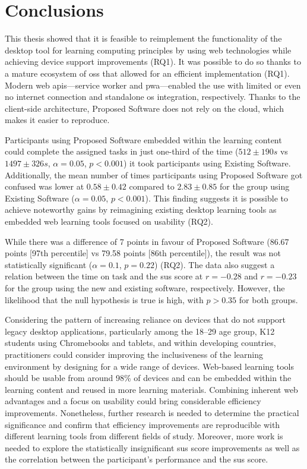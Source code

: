 \chapter{Conclusions}
\label{Conclusions}

This thesis showed that it is feasible to reimplement the functionality of the desktop tool for learning computing principles by using web technologies while achieving device support improvements (RQ1).
It was possible to do so thanks to a mature ecosystem of \gls{oss} that allowed for an efficient implementation (RQ1).
Modern web \glspl{api}---service worker and \gls{pwa}---enabled the use with limited or even no internet connection and standalone \gls{os} integration, respectively.
Thanks to the client-side architecture, Proposed Software does not rely on the cloud, which makes it easier to reproduce.

Participants using Proposed Software embedded within the learning content could complete the assigned tasks in just one-third of the time ($512 \pm190 s$ vs $1497 \pm326 s$, $\alpha=0.05$, $p<0.001$) it took participants using Existing Software.
Additionally, the mean number of times participants using Proposed Software got confused was lower at $0.58 \pm 0.42$ compared to $2.83 \pm 0.85$ for the group using Existing Software ($\alpha=0.05$, $p<0.001$).
This finding suggests it is possible to achieve noteworthy gains by reimagining existing desktop learning tools as embedded web learning tools focused on usability (RQ2).

While there was a difference of 7 points in favour of Proposed Software (86.67 points [97th percentile] vs 79.58 points [86th percentile]), the result was not statistically significant ($\alpha=0.1$, $p=0.22$) (RQ2).
The data also suggest a relation between the time on task and the \gls{sus} score at $r=-0.28$ and $r=-0.23$ for the group using the new and existing software, respectively.
However, the likelihood that the null hypothesis is true is high, with $p > 0.35$ for both groups.

Considering the pattern of increasing reliance on devices that do not support legacy desktop applications, particularly among the 18--29 age group, K12 students using Chromebooks and tablets, and within developing countries, practitioners could consider improving the inclusiveness of the learning environment by designing for a wide range of devices.
Web-based learning tools should be usable from around 98\% of devices and can be embedded within the learning content and reused in more learning materials.
Combining inherent web advantages and a focus on usability could bring considerable efficiency improvements.
Nonetheless, further research is needed to determine the practical significance and confirm that efficiency improvements are reproducible with different learning tools from different fields of study.
Moreover, more work is needed to explore the statistically insignificant \gls{sus} score improvements as well as the correlation between the participant's performance and the \gls{sus} score.
